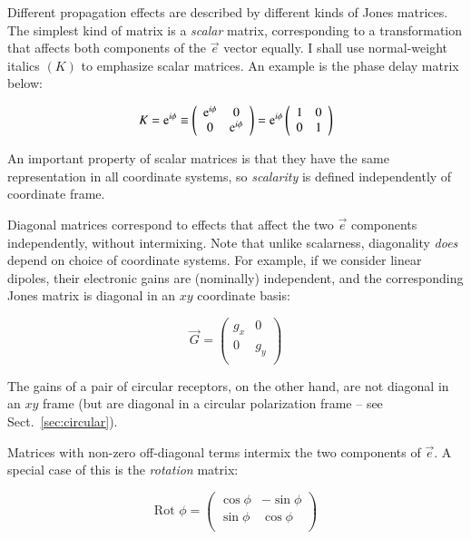 \documentclass{aa}
\newcommand{\jones}[2]{\vec {#1}_{#2}}
\begin{document}
Different propagation effects are described by different kinds of Jones matrices. The simplest kind of matrix is a {\em scalar} matrix, corresponding to a transformation that affects both components of the $\vec e$ vector equally. I shall use normal-weight italics $(K)$ to emphasize scalar matrices. An example is the phase delay matrix below:

    \[
    K = {\rm e}^{i\phi} \equiv 
    \left( 
    \begin{array}{cc}
    {\rm e}^{i\phi} & 0 \\
    0 & {\rm e}^{i\phi} \\
    \end{array}
    \right) =   
    {\rm e}^{i\phi} \left( 
    \begin{array}{cc}
    1 & 0 \\
    0 & 1 \\
    \end{array}
    \right)    
    \]

An important property of scalar matrices is that they have the same representation in all coordinate systems, so {\em scalarity} is defined independently of coordinate frame.

Diagonal matrices correspond to effects that affect the two $\vec e$ components independently, without intermixing. Note that unlike scalarness, diagonality {\em does} depend on choice of coordinate systems. For example, if we consider linear dipoles, their electronic gains are (nominally) independent, and the corresponding Jones matrix is diagonal in an $xy$ coordinate basis:

    \[
    \jones{G}{} = 
    \left( 
    \begin{array}{cc}
    g_x & 0 \\
    0 & g_y \\
    \end{array}
    \right) 
    \]

The gains of a pair of circular receptors, on the other hand, are not diagonal in an $xy$ frame (but are diagonal in a circular polarization frame -- see Sect.~\ref{sec:circular}).

Matrices with non-zero off-diagonal terms intermix the two components of $\vec e$. A special case of this is the {\em rotation} matrix:

    \[
    \mbox{Rot~}\phi = 
    \left( 
    \begin{array}{cc}
    \cos\phi & -\sin\phi \\
    \sin\phi & \cos\phi \\
    \end{array}
    \right) 
    \]
\end{document}
